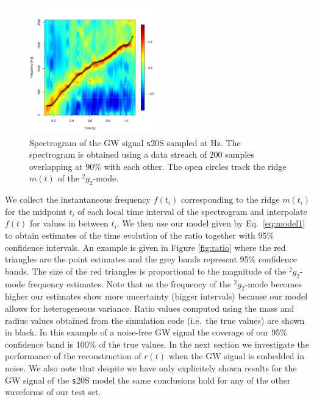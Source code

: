 \begin{figure}
 \centering
 \includegraphics[width=0.5\textwidth]{plots/spectrogram}
 \caption{Spectrogram of the GW signal {\texttt s20S} sampled at \unit[4096]{Hz}.
   The spectrogram is obtained using a data streach of 200 samples overlapping at 90\%
   with each other. The open circles track the ridge $m(t) $ of the $\mbox{}^2 g_2$-mode. } \label{fig:spectrogram}
\end{figure}

We collect the instantaneous frequency $f(t_i)$ corresponding to the ridge $m(t_i)$ for
the midpoint $t_i$ of each local time interval of the spectrogram and interpolate $f(t)$
for values in between $t_i$. We then use our model given by Eq.~\eqref{eq:model1} to obtain
estimates of the time evolution of the ratio together with 95\% confidence intervals.
An example is given in Figure \ref{fig:ratio} where the red triangles are the point estimates and
the grey bands represent 95\% confidence bands. The size of the red triangles is proportional to the magnitude of the $\mbox{}^2 g_2$-mode frequency estimates.
Note that as the frequency of the $\mbox{}^2 g_2$-mode becomes higher our estimates show more uncertainty (bigger intervals) because our model allows for heterogeneous variance. Ratio values
computed using the mass and radius values obtained from the simulation code (i.e.~the true values)
are shown in black. In this example of a noise-free GW signal the coverage of our 95\% confidence band is 100\%
of the true values. In the next section we investigate the performance of the reconstruction of $r(t)$ when the GW
signal is embedded in noise. We also note that despite we have only explicitely shown results for the GW signal of the {\texttt s20S} model the same conclusions hold for any of the other waveforms of our test set.

